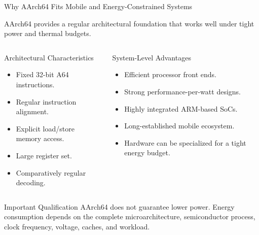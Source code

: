 \documentclass[aspectratio=169,11pt,t]{beamer}
\begin{document}

\begin{frame}{Why AArch64 Fits Mobile and Energy-Constrained Systems}

AArch64 provides a regular architectural foundation
that works well under tight power and thermal budgets.

\vspace{-0.2cm}

\begin{columns}[T,onlytextwidth]


\begin{block}{Architectural Characteristics}
\begin{itemize}
  \item Fixed 32-bit A64 instructions.
  \item Regular instruction alignment.
  \item Explicit load/store memory access.
  \item Large register set.
  \item Comparatively regular decoding.
\end{itemize}
\end{block}


\begin{block}{System-Level Advantages}
\begin{itemize}
  \item Efficient processor front ends.
  \item Strong performance-per-watt designs.
  \item Highly integrated ARM-based SoCs.
  \item Long-established mobile ecosystem.
  \item Hardware can be specialized
        for a tight energy budget.
\end{itemize}
\end{block}

\end{columns}

\vspace{-0.1cm}

\begin{block}{Important Qualification}
AArch64 does not guarantee lower power.
Energy consumption depends on the complete
microarchitecture, semiconductor process,
clock frequency, voltage, caches, and workload.
\end{block}

\end{frame}
\end{document}
